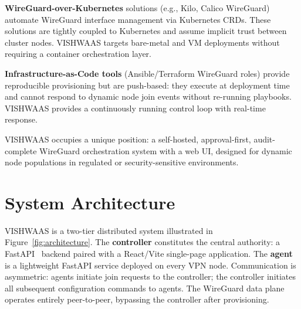 \documentclass[conference]{IEEEtran}
\begin{document}
\textbf{WireGuard-over-Kubernetes} solutions (e.g., Kilo, Calico WireGuard)
automate WireGuard interface management via Kubernetes CRDs. These solutions are
tightly coupled to Kubernetes and assume implicit trust between cluster nodes.
VISHWAAS targets bare-metal and VM deployments without requiring a container
orchestration layer.

\textbf{Infrastructure-as-Code tools} (Ansible/Terraform WireGuard roles) provide
reproducible provisioning but are push-based: they execute at deployment time and
cannot respond to dynamic node join events without re-running playbooks. VISHWAAS
provides a continuously running control loop with real-time response.

VISHWAAS occupies a unique position: a self-hosted, approval-first, audit-complete
WireGuard orchestration system with a web UI, designed for dynamic node
populations in regulated or security-sensitive environments.


\section{System Architecture}
\label{sec:architecture}

VISHWAAS is a two-tier distributed system illustrated in
Figure~\ref{fig:architecture}. The \textbf{controller} constitutes the central
authority: a FastAPI~\cite{fastapi} backend paired with a React\slash{}Vite
single-page application. The \textbf{agent} is a lightweight FastAPI service
deployed on every VPN node. Communication is asymmetric: agents initiate join
requests to the controller; the controller initiates all subsequent configuration
commands to agents. The WireGuard data plane operates entirely peer-to-peer,
bypassing the controller after provisioning.
\end{document}
